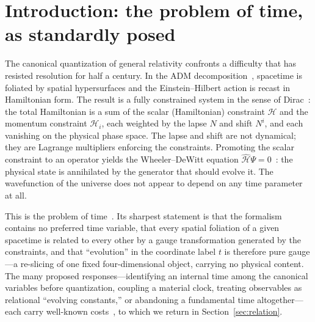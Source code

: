 \documentclass[11pt,a4paper]{article}
\theoremstyle{plain}
\theoremstyle{definition}
\theoremstyle{remark}
\begin{document}
\begin{abstract}
The problem of time is thereby \emph{dissolved} as a category error, not solved by an addition to the formalism, in exactly the way the inference that gravitational collapse completes at finite exterior time falls to a refusal of the same reification~\cite{JanzenBHcausality}---the shape of the two errors being one, while the horizon's refutation is carried by general relativity's own causal structure and needs no part of this correction.
\end{abstract}

\section{Introduction: the problem of time, as standardly posed}\label{sec:intro}

The canonical quantization of general relativity confronts a difficulty that has resisted resolution for half a century. In the ADM decomposition~\cite{ADM1962}, spacetime is foliated by spatial hypersurfaces and the Einstein--Hilbert action is recast in Hamiltonian form. The result is a fully constrained system in the sense of Dirac~\cite{Dirac1964}: the total Hamiltonian is a sum of the scalar (Hamiltonian) constraint $\mathcal{H}$ and the momentum constraint $\mathcal{H}_i$, each weighted by the lapse $N$ and shift $N^i$, and each vanishing on the physical phase space. The lapse and shift are not dynamical; they are Lagrange multipliers enforcing the constraints. Promoting the scalar constraint to an operator yields the Wheeler--DeWitt equation $\hat{\mathcal{H}}\Psi = 0$~\cite{DeWitt1967}: the physical state is annihilated by the generator that should evolve it. The wavefunction of the universe does not appear to depend on any time parameter at all.

This is the problem of time~\cite{Kuchar1992, Isham1993}. Its sharpest statement is that the formalism contains no preferred time variable, that every spatial foliation of a given spacetime is related to every other by a gauge transformation generated by the constraints, and that ``evolution'' in the coordinate label $t$ is therefore pure gauge---a re-slicing of one fixed four-dimensional object, carrying no physical content. The many proposed responses---identifying an internal time among the canonical variables before quantization, coupling a material clock, treating observables as relational ``evolving constants,'' or abandoning a fundamental time altogether---each carry well-known costs~\cite{Kuchar1992, Isham1993, Rovelli2004, BarbourEnd}, to which we return in Section~\ref{sec:relation}.
\end{document}
